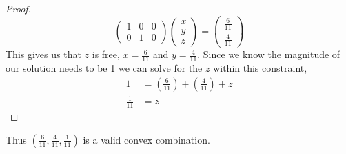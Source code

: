 \documentclass[12pt]{article}
\makeatletter
\theoremstyle{homework}
\newenvironment{exercise}[1]
{\def\@currentlabel{#1}\exercisecore}
{\endexercisecore}
\makeatother
\begin{document}
\begin{exercise}{3.18}
\begin{proof}
\begin{equation*}
      \begin{pmatrix}
        1&0 &0 \\
        0&1 &0  
      \end{pmatrix}
      \begin{pmatrix}
        x\\
        y\\
        z
      \end{pmatrix}
       = 
       \begin{pmatrix}
        \frac{6}{11}\\
        \frac{4}{11}
       \end{pmatrix}
    \end{equation*}
    This gives us that $z$ is free, $x = \frac{6}{11}$ and $y = \frac{4}{11}$. Since we know the magnitude of our solution needs to be 1
    we can solve for the $z$ within this constraint, 
    \begin{align*}
      1 &= \left(\frac{6}{11}\right) + \left(\frac{4}{11}\right) + z \\
      \frac{1}{11} &=  z 
    \end{align*}
    \end{proof}
    Thus $(\frac{6}{11}, \frac{4}{11}, \frac{1}{11})$ is a valid convex combination. 
\end{exercise}
\vspace{.5in}
\end{document}
